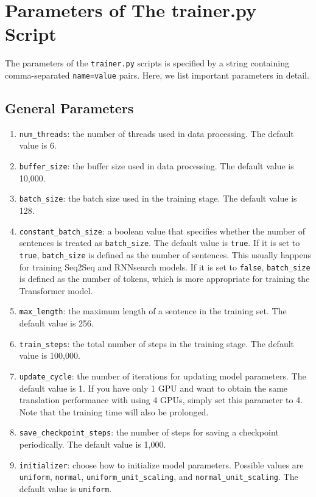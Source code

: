 \documentclass{article}
\begin{document}
\appendix

\section{Parameters of The trainer.py Script}
The parameters of the \verb|trainer.py| scripts is specified by a string containing comma-separated \verb|name=value| pairs. Here, we list important parameters in detail.

\subsection{General Parameters}
\begin{enumerate}
\item \verb|num_threads|: the number of threads used in data processing. The default value is 6.
\item \verb|buffer_size|: the buffer size used in data processing. The default value is 10,000.
\item \verb|batch_size|: the batch size used in the training stage. The default value is 128.
\item \verb|constant_batch_size|: a boolean value that specifies whether the number of sentences is treated as \verb|batch_size|. The default value is \verb|true|. If it is set to \verb|true|, \verb|batch_size| is defined as the number of sentences. This usually happens for training Seq2Seq and RNNsearch models. If it is set to \verb|false|, \verb|batch_size| is defined as the number of tokens, which is more appropriate for training the Transformer model.
\item \verb|max_length|: the maximum length of a sentence in the training set. The default value is 256.
\item \verb|train_steps|: the total number of steps in the training stage. The default value is 100,000.
\item \verb|update_cycle|:  the number of iterations for updating model parameters. The default value is 1. If you have only 1 GPU and want to obtain the same translation performance with using 4 GPUs, simply set this parameter to 4. Note that the training time will also be prolonged.
\item \verb|save_checkpoint_steps|: the number of steps for saving a checkpoint periodically.  The default value is 1,000.
\item \verb|initializer|: choose how to initialize model parameters. Possible values are \verb|uniform|, \verb|normal|, \verb|uniform_unit_scaling|, and \verb|normal_unit_scaling|. The default value is \verb|uniform|.

\end{enumerate}
\end{document}
